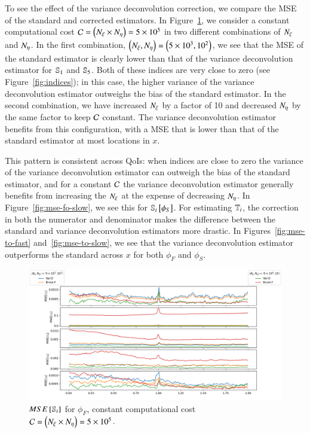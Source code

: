 To see the effect of the variance deconvolution correction, we compare the MSE of the standard and corrected estimators.
In Figure~\ref{fig:mse-fo-fast}, we consider a constant computational cost $\C = \left( \Nxi \times \Neta \right) = 5 \times 10^5$ in two different combinations of $\Nxi$ and $\Neta$.
In the first combination, $\left( \Nxi, \Neta \right) = \left( 5 \times 10^3, 10^2 \right)$, we see that the MSE of the standard estimator is clearly lower than that of the variance deconvolution estimator for $\S{1}$ and $\S{5}$. 
Both of these indices are very close to zero (see Figure~\ref{fig:indices}); in this case, the higher variance of the variance deconvolution estimator outweighs the bias of the standard estimator.
In the second combination, we have increased $\Nxi$ by a factor of 10 and decreased $\Neta$ by the same factor to keep $\C$ constant.
The variance deconvolution estimator benefits from this configuration, with a MSE that is lower than that of the standard estimator at most locations in $x$. 

This pattern is consistent across QoIs: when indices are close to zero the variance of the variance deconvolution estimator can outweigh the bias of the standard estimator, and for a constant $\C$ the variance deconvolution estimator generally benefits from increasing the $\Nxi$ at the expense of decreasing $\Neta$. 
In Figure~\ref{fig:mse-fo-slow}, we see this for $\S{i} \left[ \phi_S \right]$.
For estimating $\T{i}$, the correction in both the numerator and denominator makes the difference between the standard and variance deconvolution estimators more drastic.
In Figures~\ref{fig:mse-to-fast} and~\ref{fig:mse-to-slow}, we see that the variance deconvolution estimator outperforms the standard across $x$ for both $\phi_F$ and $\phi_S$.

\begin{figure}
    \centering
    \includegraphics[width=\textwidth]{figures/mse_firstorder_fast.png}
    \caption{$MSE\left[\S{i}\right]$ for $\phi_F$, constant computational cost $\C = \left( \Nxi \times \Neta \right) = 5 \times 10^5$.}
    \label{fig:mse-fo-fast}
\end{figure}

